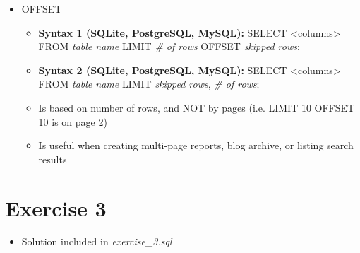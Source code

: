 \documentclass[12pt]{article}
\begin{document}
\begin{itemize}
    \item OFFSET
    \begin{itemize}
        \item \textbf{Syntax 1 (SQLite, PostgreSQL, MySQL):} SELECT <columns> FROM \textit{table name} LIMIT \textit{\# of rows} OFFSET \textit{skipped rows};
        \item \textbf{Syntax 2 (SQLite, PostgreSQL, MySQL):} SELECT <columns> FROM \textit{table name} LIMIT \textit{skipped rows}, \textit{\# of rows};
        \item Is based on number of rows, and NOT by pages (i.e. LIMIT 10 OFFSET 10 is on page 2)
        \item Is useful when creating multi-page reports, blog archive, or listing search results
    \end{itemize}
\end{itemize}


\bigskip

\section{Exercise 3}

\bigskip

\begin{itemize}
    \item Solution included in \textit{exercise\_3.sql}
\end{itemize}

\bigskip
\end{document}
